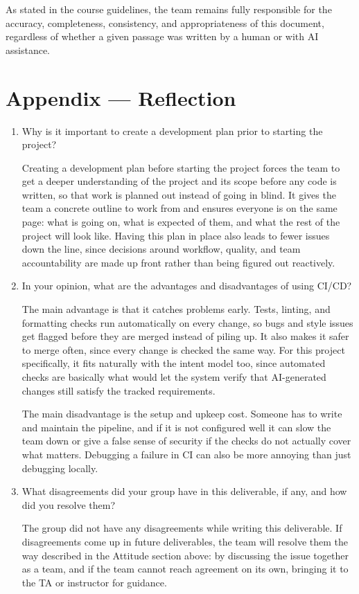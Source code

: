 \documentclass{article}
\begin{document}
As stated in the course guidelines, the team remains fully responsible for the
accuracy, completeness, consistency, and appropriateness of this document,
regardless of whether a given passage was written by a human or with AI
assistance.

\newpage{}

\section*{Appendix --- Reflection}




\begin{enumerate}
    \item Why is it important to create a development plan prior to starting the
    project?

    Creating a development plan before starting the project forces the team to
    get a deeper understanding of the project and its scope before any code is
    written, so that work is planned out instead of going in blind. It gives the
    team a concrete outline to work from and ensures everyone is on the same
    page: what is going on, what is expected of them, and what the rest of the
    project will look like. Having this plan in place also leads to fewer issues
    down the line, since decisions around workflow, quality, and team
    accountability are made up front rather than being figured out reactively.

    \item In your opinion, what are the advantages and disadvantages of using
    CI/CD?

    The main advantage is that it catches problems early. Tests, linting, and
    formatting checks run automatically on every change, so bugs and style
    issues get flagged before they are merged instead of piling up. It also
    makes it safer to merge often, since every change is checked the same way.
    For this project specifically, it fits naturally with the intent model too,
    since automated checks are basically what would let the system verify that
    AI-generated changes still satisfy the tracked requirements.

    The main disadvantage is the setup and upkeep cost. Someone has to write
    and maintain the pipeline, and if it is not configured well it can slow the
    team down or give a false sense of security if the checks do not actually
    cover what matters. Debugging a failure in CI can also be more annoying
    than just debugging locally.

    \item What disagreements did your group have in this deliverable, if any,
    and how did you resolve them?

    The group did not have any disagreements while writing this deliverable.
    If disagreements come up in future deliverables, the team will resolve them
    the way described in the Attitude section above: by discussing the issue
    together as a team, and if the team cannot reach agreement on its own,
    bringing it to the TA or instructor for guidance.
\end{enumerate}
\end{document}
